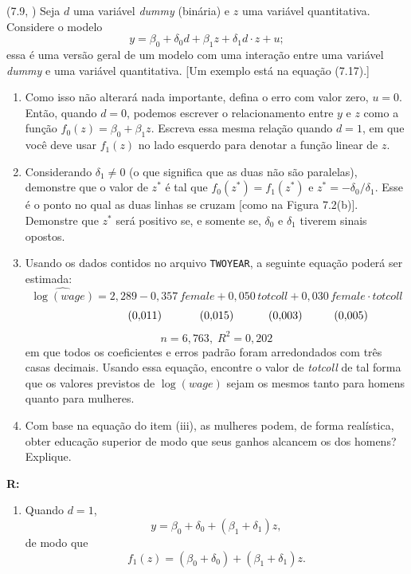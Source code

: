 \documentclass[12pt,letterpaper, onecolumn]{exam}
\renewenvironment{solution}
{\par\noindent\textbf{R:}\enspace\color{blue}}
{\par\color{black}}
\begin{document}
\begin{questions}
\question (7.9, \citep{wooldridge2016}) Seja \(d\) uma variável \textit{dummy} (binária) e \(z\) uma variável quantitativa. Considere o modelo
\[
y = \beta_0 + \delta_0 d + \beta_1 z + \delta_1 d \cdot z + u;
\]
essa é uma versão geral de um modelo com uma interação entre uma variável \textit{dummy} e uma variável quantitativa. [Um exemplo está na equação (7.17).]
\begin{enumerate}[label=(\roman*)]
    \item Como isso não alterará nada importante, defina o erro com valor zero, \(u=0\). Então, quando \(d=0\), podemos escrever o relacionamento entre \(y\) e \(z\) como a função \(f_0(z)=\beta_0+\beta_1 z\). Escreva essa mesma relação quando \(d=1\), em que você deve usar \(f_1(z)\) no lado esquerdo para denotar a função linear de \(z\).
    \item Considerando \(\delta_1 \neq 0\) (o que significa que as duas não são paralelas), demonstre que o valor de \(z^\ast\) é tal que \(f_0(z^\ast)=f_1(z^\ast)\) e \(z^\ast = -\delta_0/\delta_1\). Esse é o ponto no qual as duas linhas se cruzam [como na Figura 7.2(b)]. Demonstre que \(z^\ast\) será positivo se, e somente se, \(\delta_0\) e \(\delta_1\) tiverem sinais opostos.
    \item Usando os dados contidos no arquivo \texttt{TWOYEAR}, a seguinte equação poderá ser estimada:
    \[
    \widehat{\log(wage)} = 2{,}289 - 0{,}357\,female + 0{,}050\,totcoll + 0{,}030\,female \cdot totcoll
    \]
    \[
    \hspace{2.0cm} (0{,}011)\hspace{1.2cm}(0{,}015)\hspace{1.1cm}(0{,}003)\hspace{1.0cm}(0{,}005)
    \]
    \[
    n = 6{,}763,\; R^2 = 0{,}202
    \]
    em que todos os coeficientes e erros padrão foram arredondados com três casas decimais. Usando essa equação, encontre o valor de \textit{totcoll} de tal forma que os valores previstos de \(\log(wage)\) sejam os mesmos tanto para homens quanto para mulheres.
    \item Com base na equação do item (iii), as mulheres podem, de forma realística, obter educação superior de modo que seus ganhos alcancem os dos homens? Explique.
\end{enumerate}

\begin{solution}
\begin{enumerate}[label=(\roman*)]
    \item Quando \(d=1\),
    \[
    y = \beta_0 + \delta_0 + (\beta_1+\delta_1)z,
    \]
    de modo que
    \[
    f_1(z)= (\beta_0+\delta_0)+(\beta_1+\delta_1)z.
    \]


\end{enumerate}
\end{solution}
\end{questions}
\end{document}
